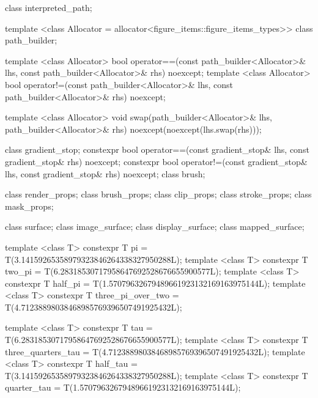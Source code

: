 \begin{codeblock}
{{{{  class interpreted_path;

  template <class Allocator = allocator<figure_items::figure_items_types>>
  class path_builder;

  template <class Allocator>
  bool operator==(const path_builder<Allocator>& lhs, 
    const path_builder<Allocator>& rhs) noexcept;
  template <class Allocator>
  bool operator!=(const path_builder<Allocator>& lhs, 
    const path_builder<Allocator>& rhs) noexcept;
  
  template <class Allocator>
  void swap(path_builder<Allocator>& lhs, path_builder<Allocator>& rhs)
    noexcept(noexcept(lhs.swap(rhs)));

  class gradient_stop;
  constexpr bool operator==(const gradient_stop& lhs, const gradient_stop& rhs)
    noexcept;
  constexpr bool operator!=(const gradient_stop& lhs, const gradient_stop& rhs)
    noexcept;
  class brush;

  class render_props;
  class brush_props;
  class clip_props;
  class stroke_props;
  class mask_props;
    
  class surface;
  class image_surface;
  class display_surface;
  class mapped_surface;
  
  template <class T>
  constexpr T pi = T(3.14159265358979323846264338327950288L);
  template <class T>
  constexpr T two_pi = T(6.28318530717958647692528676655900577L);
  template <class T>
  constexpr T half_pi = T(1.57079632679489661923132169163975144L);
  template <class T>
  constexpr T three_pi_over_two = T(4.71238898038468985769396507491925432L);

  template <class T>
  constexpr T tau = T(6.28318530717958647692528676655900577L);
  template <class T>
  constexpr T three_quarters_tau = T(4.71238898038468985769396507491925432L);
  template <class T>
  constexpr T half_tau = T(3.14159265358979323846264338327950288L);
  template <class T>
  constexpr T quarter_tau = T(1.57079632679489661923132169163975144L);

}}}}
\end{codeblock}

